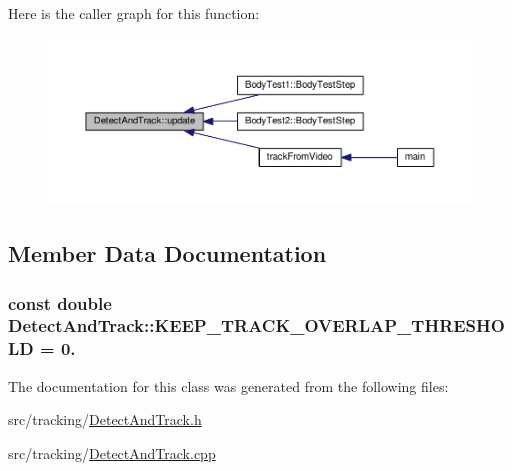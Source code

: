 Here is the caller graph for this function\+:
\nopagebreak
\begin{figure}[H]
\begin{center}
\leavevmode
\includegraphics[width=350pt]{class_detect_and_track_a1b07a50a71807fea2f99d43a3de29912_icgraph}
\end{center}
\end{figure}




\subsection{Member Data Documentation}
\subsubsection[{\texorpdfstring{K\+E\+E\+P\+\_\+\+T\+R\+A\+C\+K\+\_\+\+O\+V\+E\+R\+L\+A\+P\+\_\+\+T\+H\+R\+E\+S\+H\+O\+LD}{KEEP_TRACK_OVERLAP_THRESHOLD}}]{\setlength{\rightskip}{0pt plus 5cm}const double Detect\+And\+Track\+::\+K\+E\+E\+P\+\_\+\+T\+R\+A\+C\+K\+\_\+\+O\+V\+E\+R\+L\+A\+P\+\_\+\+T\+H\+R\+E\+S\+H\+O\+LD = 0.}\hypertarget{class_detect_and_track_a234e0a61c8eb494d72e562f69173d911}{}\label{class_detect_and_track_a234e0a61c8eb494d72e562f69173d911}


The documentation for this class was generated from the following files\+:\begin{DoxyCompactItemize}
\item 
src/tracking/\hyperlink{_detect_and_track_8h}{Detect\+And\+Track.\+h}\item 
src/tracking/\hyperlink{_detect_and_track_8cpp}{Detect\+And\+Track.\+cpp}\end{DoxyCompactItemize}
